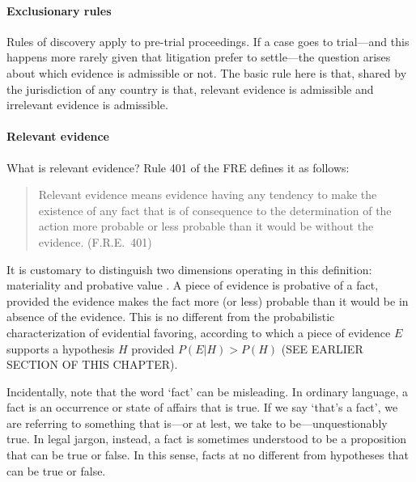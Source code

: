 \documentclass[10pt]{article}
\begin{document}








\paragraph{Exclusionary rules}

Rules of discovery apply to pre-trial proceedings. If a case goes to trial---and this happens more 
rarely given that litigation prefer to settle---the question arises about which 
evidence is admissible or not. The basic rule here is that, shared by the jurisdiction of any country 
is that, relevant evidence is admissible and irrelevant evidence is admissible.
\paragraph{Relevant evidence}
What is relevant evidence? 
Rule 401 of the FRE defines it as follows:
%
\begin{quote}
\begin{singlespace}
Relevant evidence means evidence having any tendency to make the existence of any fact that is of consequence to the determination of the action more probable or less probable than it would be without the evidence. (F.R.E.\ 401)
\end{singlespace}
\end{quote}
%
It is customary to distinguish two dimensions operating in this definition: materiality and probative value \citep{Fisher2008Evidence, Mendez2008}. A piece of evidence is probative of a fact, provided the evidence makes the fact more (or less) probable than it would be in absence of the evidence. This is no different from the probabilistic characterization of 
evidential favoring, according to which a piece of evidence $E$ supports a hypothesis $H$ provided $P(E|H)> P(H)$ (SEE EARLIER SECTION OF THIS CHAPTER). 

Incidentally, note that the word `fact' can be misleading. In ordinary language, a fact is an occurrence or state of affairs that is true. If we say `that's a fact', we are referring to 
something that is---or at lest, we take to be---unquestionably true. In legal jargon, instead, a fact is sometimes understood to be a proposition 
that can be true or false. In this sense, facts at no different from hypotheses that can be true or false.
\end{document}
